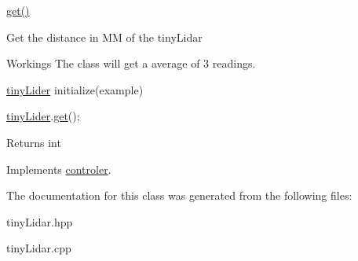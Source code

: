 \mbox{\hyperlink{classtiny_lider_ac69b92b0bd4056f6378e7e13aafa57b5}{get()}} 

Get the distance in MM of the tiny\+Lidar

\begin{DoxyParagraph}{Workings}
The class will get a average of 3 readings.
\end{DoxyParagraph}
\mbox{\hyperlink{classtiny_lider}{tiny\+Lider}} initialize(example) 
\begin{DoxyCode}
\mbox{\hyperlink{classtiny_lider}{tinyLider}}.\mbox{\hyperlink{classtiny_lider_ac69b92b0bd4056f6378e7e13aafa57b5}{get}}();
\end{DoxyCode}


\begin{DoxyReturn}{Returns}
int 
\end{DoxyReturn}


Implements \mbox{\hyperlink{classcontroler}{controler}}.



The documentation for this class was generated from the following files\+:\begin{DoxyCompactItemize}
\item 
tiny\+Lidar.\+hpp\item 
tiny\+Lidar.\+cpp\end{DoxyCompactItemize}

